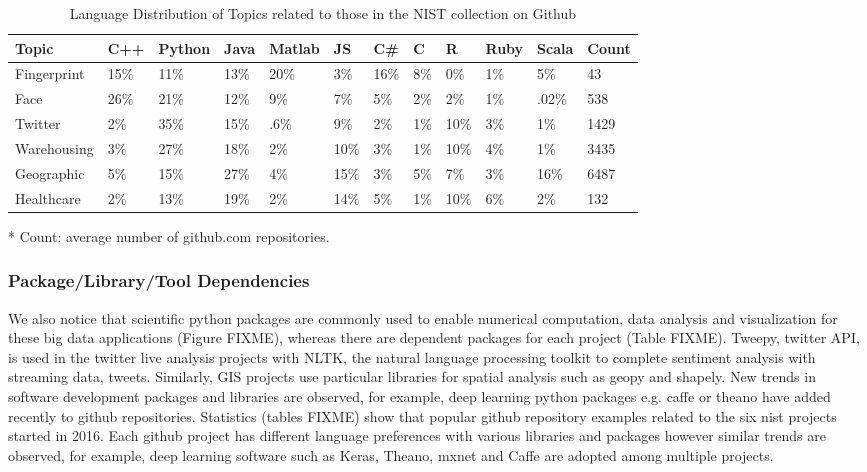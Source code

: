 \documentclass[9pt,twocolumn,twoside]{styles/osajnl}
\begin{document}
\begin{table}[htb]
  \begin{center}
    \begin{small}
      \begin{threeparttable}
	\begin{tabular}{l|l|l|l|l|l|l|l|l|l|l|l}

	  Topic & C++ &  Python &  Java &  Matlab &  JS &  C\# &  C &  R &  Ruby &  Scala &  Count\tnote{*} \tabularnewline \hline \hline
	  Fingerprint& 15\% & 11\% & 13\% & 20\% & 3\% & 16\% & 8\% & 0\% & 1\% & 5\% & 43 \tabularnewline \hline
	  Face & 26\% & 21\% & 12\% & 9\% & 7\% & 5\% & 2\% & 2\% & 1\% & .02\% & 538 \tabularnewline \hline
	  Twitter & 2\% & 35\% & 15\% & .6\% & 9\% & 2\% & 1\% & 10\% & 3\% & 1\% & 1429 \tabularnewline \hline
	  Warehousing & 3\% & 27\% & 18\% & 2\% & 10\% & 3\% & 1\% & 10\% & 4\% & 1\% & 3435  \tabularnewline \hline
	  Geographic & 5\% & 15\% & 27\% & 4\% & 15\% & 3\% & 5\% & 7\% & 3\% & 16\% & 6487 \tabularnewline \hline
	  Healthcare & 2\% & 13\% & 19\% & 2\% & 14\% & 5\% & 1\% & 10\% & 6\% & 2\% & 132 \tabularnewline

	\end{tabular}
	\caption{Language Distribution of Topics related to those in the NIST collection on Github}
	\label{tab:language-distribution}
	\begin{tablenotes}
	\item[*] Count: average number of github.com repositories.
	\end{tablenotes}
      \end{threeparttable}
    \end{small}
  \end{center}
\end{table}

\subsubsection{Package/Library/Tool Dependencies}

We also notice that scientific python packages are commonly used to
enable numerical computation, data analysis and visualization for
these big data applications (Figure FIXME), whereas there are dependent
packages for each project (Table FIXME). Tweepy, twitter API, is used in
the twitter live analysis projects with NLTK, the natural language
processing toolkit to complete sentiment analysis with streaming data,
tweets. Similarly, GIS projects use particular libraries for spatial
analysis such as geopy and shapely. New trends in software development
packages and libraries are observed, for example, deep learning python
packages e.g. caffe or theano have added recently to github
repositories. Statistics (tables FIXME) show that popular github
repository examples related to the six nist projects started in
2016. Each github project has different language preferences with
various libraries and packages however similar trends are observed,
for example, deep learning software such as Keras, Theano, mxnet and
Caffe are adopted among multiple projects.
\end{document}
